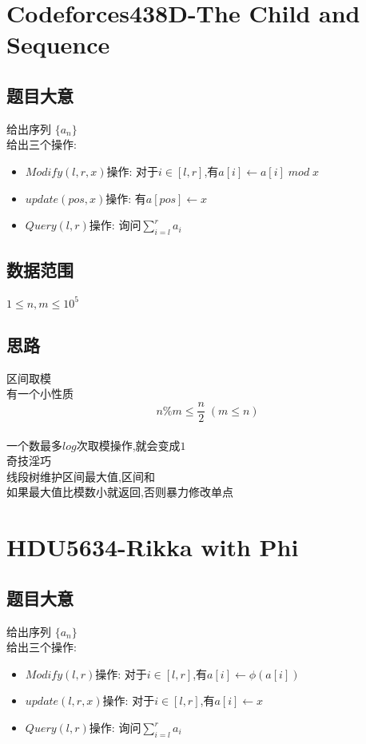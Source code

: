 \documentclass{ctexart}
\numberwithin{equation}{section}
\begin{document}
\begin{flushleft}
  \section{Codeforces438D-The Child and Sequence}
  \subsection{题目大意}
  给出序列 $\{a_n\}$\\
  给出三个操作:\\
  \begin{itemize}
  \item $Modify(l,r,x)$操作: 对于$i\in [l,r]$,有$a[i] \leftarrow a[i]\; mod \; x$
  \item $update(pos,x)$操作: 有$a[pos]\leftarrow x$
  \item $Query(l,r)$操作: 询问$\sum_{i=l}^r a_i$
  \end{itemize}
  \subsection{数据范围}
  $1\le n,m\le 10^5$\\
  \subsection{思路}
  区间取模\\
  有一个小性质$$n\% m\le \frac{n}{2} \;(m \le n)$$\\
  一个数最多$log$次取模操作,就会变成$1$\\
  奇技淫巧\\
  线段树维护区间最大值,区间和\\
  如果最大值比模数小就返回,否则暴力修改单点\\
  \newpage

  \section{HDU5634-Rikka with Phi }
  \subsection{题目大意}
  给出序列 $\{a_n\}$\\
  给出三个操作:\\
  \begin{itemize}
  \item $Modify(l,r)$操作: 对于$i\in [l,r]$,有$a[i] \leftarrow \phi(a[i])$
  \item $update(l,r,x)$操作: 对于$i\in [l,r]$,有$a[i] \leftarrow x$
  \item $Query(l,r)$操作: 询问$\sum_{i=l}^r a_i$
  \end{itemize}

\end{flushleft}
\end{document}
